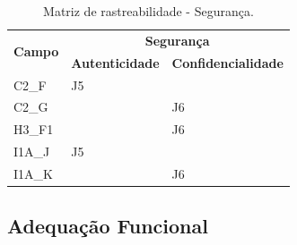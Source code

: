 \begin{table}[h]
\begin{tabular}{|l|ll|}
\hline
\multirow{2}{*}{\textbf{Campo}} & \multicolumn{2}{c|}{\textbf{Segurança}}                                  \\ \cline{2-3} 
                                & \multicolumn{1}{l|}{\textbf{Autenticidade}} & \textbf{Confidencialidade} \\ \hline
C2\_F                           & \multicolumn{1}{l|}{J5}                     &                            \\ \hline
C2\_G                           & \multicolumn{1}{l|}{}                       & J6                         \\ \hline
H3\_F1                          & \multicolumn{1}{l|}{}                       & J6                         \\ \hline
I1A\_J                          & \multicolumn{1}{l|}{J5}                     &                            \\ \hline
I1A\_K                          & \multicolumn{1}{l|}{}                       & J6                         \\ \hline
\end{tabular}
\caption{Matriz de rastreabilidade - Segurança.}
\end{table}

\subsection{Adequação Funcional}

